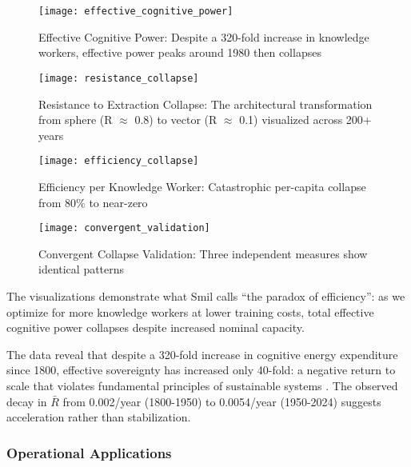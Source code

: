 \begin{figure}[h]
\centering
\texttt{[image: effective\_cognitive\_power]}
\caption{Effective Cognitive Power: Despite a 320-fold increase in knowledge workers, effective power peaks around 1980 then collapses}
\label{fig:effective_cognitive_power}
\end{figure}

\begin{figure}[h]
\centering
\texttt{[image: resistance\_collapse]}
\caption{Resistance to Extraction Collapse: The architectural transformation from sphere (R $\approx$ 0.8) to vector (R $\approx$ 0.1) visualized across 200+ years}
\label{fig:resistance_collapse}
\end{figure}

\begin{figure}[h]
\centering
\texttt{[image: efficiency\_collapse]}
\caption{Efficiency per Knowledge Worker: Catastrophic per-capita collapse from 80\% to near-zero}
\label{fig:efficiency_collapse}
\end{figure}

\begin{figure}[h]
\centering
\texttt{[image: convergent\_validation]}
\caption{Convergent Collapse Validation: Three independent measures show identical patterns}
\label{fig:convergent_validation}
\end{figure}

The visualizations demonstrate what Smil calls ``the paradox of efficiency'': as we optimize for more knowledge workers at lower training costs, total effective cognitive power collapses despite increased nominal capacity.

The data reveal that despite a 320-fold increase in cognitive energy expenditure since 1800, effective sovereignty has increased only 40-fold: a negative return to scale that violates fundamental principles of sustainable systems \citep{smil2019}. The observed decay in $\bar{R}$ from 0.002/year (1800-1950) to 0.0054/year (1950-2024) suggests acceleration rather than stabilization.

\subsubsection{Operational Applications}

